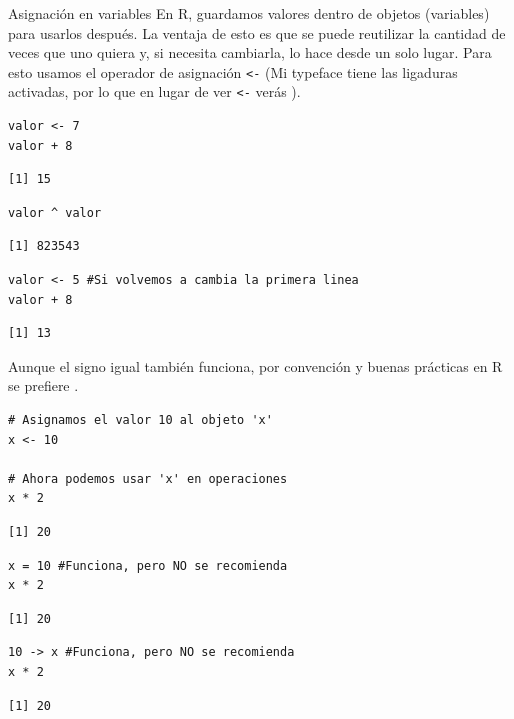 \documentclass[8pt]{beamer}
\begin{document}
\begin{frame}[fragile]{Asignación en variables}
	En R, guardamos valores dentro de objetos (variables) para usarlos después. La ventaja de esto es que se puede reutilizar la cantidad de veces que uno quiera y, si necesita cambiarla, lo hace desde un solo lugar. Para esto usamos el operador de asignación \verb|<-| (Mi typeface tiene las ligaduras activadas, por lo que en lugar de ver \verb|<-| ver\'as \rscript{<-}).
	
\begin{lstlisting}[style=RScript]
valor <- 7
valor + 8
\end{lstlisting}
\begin{lstlisting}[style=RConsole]
[1] 15
\end{lstlisting}
\begin{lstlisting}[style=RScript]
valor ^ valor	
\end{lstlisting}
\begin{lstlisting}[style=RConsole]
[1] 823543
\end{lstlisting}
\begin{lstlisting}[style=RScript]
valor <- 5 #Si volvemos a cambia la primera linea
valor + 8	
\end{lstlisting}
\begin{lstlisting}[style=RConsole]
[1] 13
\end{lstlisting}
\end{frame}





\begin{frame}[fragile]
	Aunque el signo igual \rscript{=} también funciona, por convención y buenas prácticas en R se prefiere \rscript{<-}.
\begin{lstlisting}[style=RScript]
# Asignamos el valor 10 al objeto 'x'
x <- 10

# Ahora podemos usar 'x' en operaciones
x * 2
\end{lstlisting}
\begin{lstlisting}[style=RConsole]
[1] 20
\end{lstlisting}

\begin{lstlisting}[style=RScript]
x = 10 #Funciona, pero NO se recomienda
x * 2
\end{lstlisting}
\begin{lstlisting}[style=RConsole]
[1] 20
\end{lstlisting}

\begin{lstlisting}[style=RScript]
10 -> x #Funciona, pero NO se recomienda
x * 2
\end{lstlisting}
\begin{lstlisting}[style=RConsole]
[1] 20
\end{lstlisting}
\end{frame}
\end{document}
